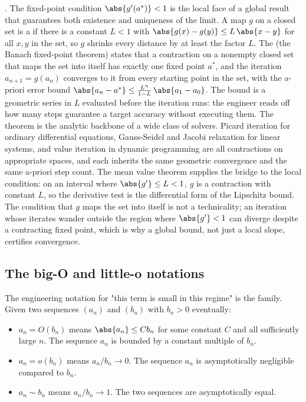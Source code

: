 \begin{mastery}
. The fixed-point condition
$\abs{g'(a^{*})} < 1$ is the local face of a global result that
guarantees both existence and uniqueness of the limit. A map $g$ on a
closed set is a  if there is a constant $L < 1$
with $\abs{g(x) - g(y)} \leq L\,\abs{x - y}$ for all $x, y$ in the set,
so $g$ shrinks every distance by at least the factor $L$. The
 (the Banach fixed-point theorem)
states that a contraction on a nonempty closed set that maps the set
into itself has exactly one fixed point $a^{*}$, and the iteration
$a_{n+1} = g(a_{n})$ converges to it from every starting point in the
set, with the a-priori error bound $\abs{a_{n} - a^{*}} \leq
\frac{L^{n}}{1 - L}\,\abs{a_{1} - a_{0}}$. The bound is a geometric
series in $L$ evaluated before the iteration runs: the engineer reads
off how many steps guarantee a target accuracy without executing them.
The theorem is the analytic backbone of a wide class of solvers. Picard
iteration for ordinary differential equations, Gauss-Seidel and Jacobi
relaxation for linear systems, and value iteration in dynamic
programming are all contractions on appropriate spaces, and each
inherits the same geometric convergence and the same a-priori step
count. The mean value theorem supplies the bridge to the local
condition: on an interval where $\abs{g'} \leq L < 1$, $g$ is a
contraction with constant $L$, so the derivative test is the
differential form of the Lipschitz bound. The condition that $g$ maps
the set into itself is not a technicality; an iteration whose iterates
wander outside the region where $\abs{g'} < 1$ can diverge despite a
contracting fixed point, which is why a global bound, not just a local
slope, certifies convergence.
\end{mastery}

\subsection{The big-O and little-o notations}

The engineering notation for "this term is small in this regime" is
the  family. Given two sequences $(a_{n})$ and
$(b_{n})$ with $b_{n} > 0$ eventually:

\begin{itemize}[leftmargin=*]
  \item $a_{n} = O(b_{n})$ means $\abs{a_{n}} \leq C b_{n}$ for some
    constant $C$ and all sufficiently large $n$. The sequence $a_{n}$
    is bounded by a constant multiple of $b_{n}$.
  \item $a_{n} = o(b_{n})$ means $a_{n} / b_{n} \to 0$. The sequence
    $a_{n}$ is asymptotically negligible compared to $b_{n}$.
  \item $a_{n} \sim b_{n}$ means $a_{n} / b_{n} \to 1$. The two
    sequences are asymptotically equal.
\end{itemize}

